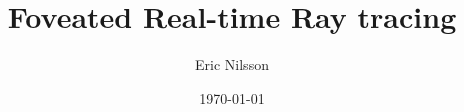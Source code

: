 \documentclass[12pt,twocolumn]{article}
\begin{document}
\title{Foveated Real-time Ray tracing}
\author{Eric Nilsson}
\date{\today}

\maketitle







{}

\end{document}
